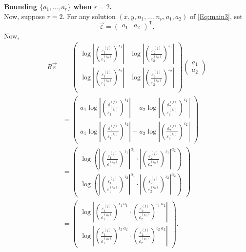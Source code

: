 \textbf{Bounding $\{a_1, \dots, a_r\}$ when $r = 2$.}\\

Now, suppose $r = 2$. For any solution $(x,y, n_1, \dots, n_{\nu}, a_1, a_2)$ of \eqref{Eq:main3}, set
\[\vec{\varepsilon} = \begin{pmatrix} a_1 & a_2 \end{pmatrix}^{\text{T}}.\]
Now, 
\begin{align*}
R\vec{\varepsilon}
	& = \begin{pmatrix}
		\log\left|\left(\frac{\varepsilon_1^{(j)}}{\varepsilon_1^{(i_0)}}\right)^{\iota_1}\right| &
		\log\left|\left(\frac{\varepsilon_2^{(j)}}{\varepsilon_2^{(i_0)}}\right)^{\iota_1}\right|\\
		\log\left|\left(\frac{\varepsilon_1^{(j)}}{\varepsilon_1^{(i_0)}}\right)^{\iota_2}\right| &
		\log\left|\left(\frac{\varepsilon_2^{(j)}}{\varepsilon_2^{(i_0)}}\right)^{\iota_2}\right|\\
		\end{pmatrix}
		\begin{pmatrix} a_1 \\ a_2 \end{pmatrix}\\
	& = \begin{pmatrix} 
		a_1\log\left|\left(\frac{\varepsilon_1^{(j)}}{\varepsilon_1^{(i_0)}}\right)^{\iota_1}\right|  
		+ a_2\log\left|\left(\frac{\varepsilon_2^{(j)}}{\varepsilon_2^{(i_0)}}\right)^{\iota_1}\right|\\
		a_1\log\left|\left(\frac{\varepsilon_1^{(j)}}{\varepsilon_1^{(i_0)}}\right)^{\iota_2}\right|  
		+ a_2\log\left|\left(\frac{\varepsilon_2^{(j)}}{\varepsilon_2^{(i_0)}}\right)^{\iota_2}\right|
	 	 \end{pmatrix}\\
	& = \begin{pmatrix} 
		\log\left(\left|\left(\frac{\varepsilon_1^{(j)}}{\varepsilon_1^{(i_0)}}\right)^{\iota_1}\right|^{a_1} \cdot 
		 \left|\left(\frac{\varepsilon_2^{(j)}}{\varepsilon_2^{(i_0)}}\right)^{\iota_1}\right|^{a_2}\right)\\
		\log\left(\left|\left(\frac{\varepsilon_1^{(j)}}{\varepsilon_1^{(i_0)}}\right)^{\iota_2}\right|^{a_1} \cdot 
		 \left|\left(\frac{\varepsilon_2^{(j)}}{\varepsilon_2^{(i_0)}}\right)^{\iota_2}\right|^{a_2}\right)	 	 		\end{pmatrix}\\
	& = \begin{pmatrix} 
		\log\left|\left(\frac{\varepsilon_1^{(j)}}{\varepsilon_1^{(i_0)}}\right)^{\iota_1 \ a_1} \cdot 
		 \left(\frac{\varepsilon_2^{(j)}}{\varepsilon_2^{(i_0)}}\right)^{\iota_1 \ a_2}\right| \\ 
		\log\left|\left(\frac{\varepsilon_1^{(j)}}{\varepsilon_1^{(i_0)}}\right)^{\iota_2\ a_2} \cdot 
		 \left(\frac{\varepsilon_2^{(j)}}{\varepsilon_2^{(i_0)}}\right)^{\iota_2 \ a_2}\right|
		 \end{pmatrix}.
\end{align*}
